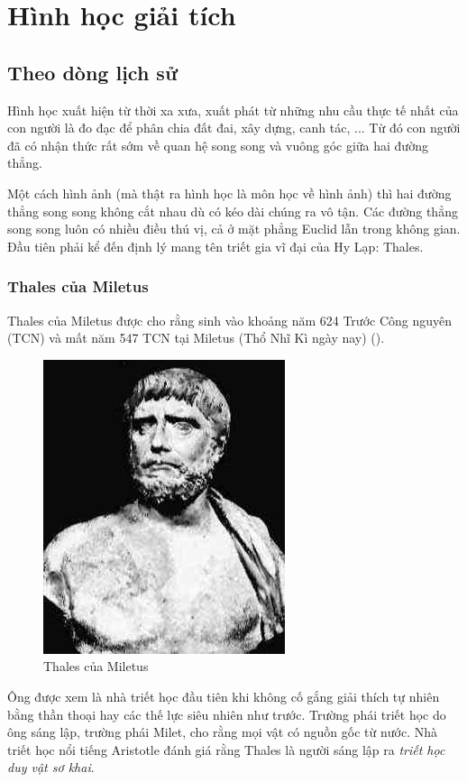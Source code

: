 \chapter{Hình học giải tích}

\section{Theo dòng lịch sử}

Hình học xuất hiện từ thời xa xưa, xuất phát từ những nhu cầu thực tế nhất của con người là đo đạc để phân chia đất đai, xây dựng, canh tác, ... Từ đó con người đã có nhận thức rất sớm về quan hệ song song và vuông góc giữa hai đường thẳng.

Một cách hình ảnh (mà thật ra hình học là môn học về hình ảnh) thì hai đường thẳng song song không cắt nhau dù có kéo dài chúng ra vô tận. Các đường thẳng song song luôn có nhiều điều thú vị, cả ở mặt phẳng Euclid lẫn trong không gian. Đầu tiên phải kể đến định lý mang tên triết gia vĩ đại của Hy Lạp: Thales.

\subsection{Thales của Miletus}

Thales của Miletus được cho rằng sinh vào khoảng năm 624 Trước Công nguyên (TCN) và mất năm 547 TCN tại Miletus (Thổ Nhĩ Kì ngày nay) (\cite{MacTutorThales}).

\begin{figure}[ht]
	\centering
	\includegraphics[scale=0.5]{analytic_geometry/Thales.jpeg}
	\caption{Thales của Miletus}
\end{figure}

Ông được xem là nhà triết học đầu tiên khi không cố gắng giải thích tự nhiên bằng thần thoại hay các thế lực siêu nhiên như trước. Trường phái triết học do ông sáng lập, trường phái Milet, cho rằng mọi vật có nguồn gốc từ nước. Nhà triết học nổi tiếng Aristotle đánh giá rằng Thales là người sáng lập ra \textit{triết học duy vật sơ khai}.

